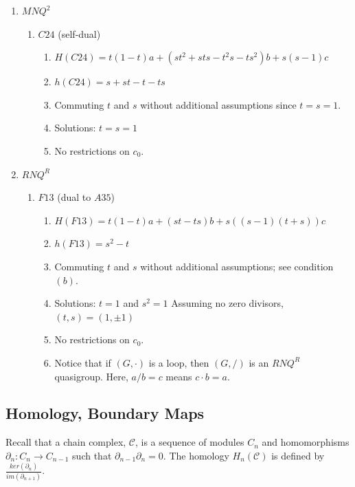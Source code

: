 \documentclass[11pt]{amsart}
\theoremstyle{definition}
\begin{document}
\begin{enumerate}
    \item[(25)] $MNQ^2$
        \begin{enumerate}
            \item $C24$ (self-dual)
            \begin{enumerate}
                \item  $H(C24) = t(1-t)a+(st^2+sts -t^2s-ts^2)b+s(s-1)c$
                \item $h(C24) = s+st-t-ts$
                \item Commuting $t$ and $s$ without additional assumptions since $t=s=1$.
                \item Solutions: $t=s=1$ 
                \item No restrictions on $c_0$.
            \end{enumerate}
        \end{enumerate} 


    \item[(26)] $RNQ^R$
        \begin{enumerate}
            \item $F13$ (dual to $A35$)
            \begin{enumerate}
                \item      $H(F13) = t(1-t)a +(st-ts)b+s((s-1)(t+s))c$
                \item  $h(F13)=s^2-t$
                \item Commuting $t$ and $s$ without additional assumptions; see condition $(b)$.
                \item Solutions: $t=1$ and $s^2=1$ Assuming no zero divisors, $(t,s) = (1, \pm 1)$ 
                \item No restrictions on $c_0$.
                \item Notice that if $(G, \cdot)$ is a loop, then $(G,/)$ is an $RNQ^R$ quasigroup. Here, $a/b =c$ means $c\cdot b = a$.
            \end{enumerate}
        \end{enumerate}  
        
    \end{enumerate}

\bigskip
\subsection{Homology, Boundary Maps}\label{S:homologyboundary}
Recall that a chain complex, $\mathcal C$, is a sequence of modules $C_n$ and homomorphisms $\partial_n: C_n \to C_{n-1}$ such that $\partial_{n-1}\partial_n=0$. The homology $H_n(\mathcal{C})$ is defined by 
$\frac{ker(\partial_n)}{im(\partial_{n+1})}$.
\end{document}

